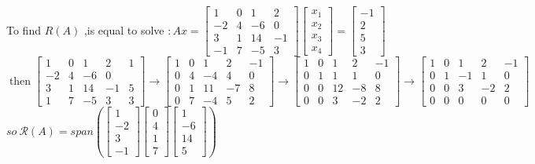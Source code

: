 \documentclass[english,onecolumn]{IEEEtran}
\begin{document}
\begin{enumerate}
To find $R(A)$ ,is equal to solve $: A x=\left[\begin{array}{cccc}1 & 0 & 1 & 2 \\ -2 & 4 & -6 & 0 \\ 3 & 1 & 14 & -1 \\ -1 & 7 & -5 & 3\end{array}\right]\left[\begin{array}{l}x_{1} \\ x_{2} \\ x_{3} \\ x_{4}\end{array}\right]=\left[\begin{array}{c}-1 \\ 2 \\ 5 \\ 3\end{array}\right]$
\\$\operatorname{then}\left[\begin{array}{cccc|c}1 & 0 & 1 & 2 & 1 \\ -2 & 4 & -6 & 0 \\ 3 & 1 & 14 & -1 & 5 \\ 1 & 7 & -5 & 3 & 3\end{array}\right] \rightarrow\left[\begin{array}{cccc|c}1 & 0 & 1 & 2 & -1 \\ 0 & 4 & -4 & 4 & 0 \\ 0 & 1 & 11 & -7 & 8 \\ 0 & 7 & -4 & 5 & 2\end{array}\right] \rightarrow\left[\begin{array}{cccc|c}1 & 0 & 1 & 2 & -1 \\ 0 & 1 & 1 & 1 & 0 \\ 0 & 0 & 12 & -8 & 8 \\ 0 & 0 & 3 & -2 & 2\end{array}\right] \rightarrow\left[\begin{array}{cccc|c}1 & 0 & 1 & 2 & -1 \\ 0 & 1 & -1 & 1 & 0 \\ 0 & 0 & 3 & -2 & 2 \\ 0 & 0 & 0 & 0 & 0\end{array}\right] $
\\$so\  \mathcal R(A)=span\left(\left[\begin{array}{c}1 \\ -2 \\ 3 \\ -1\end{array}\right]\left[\begin{array}{c}0 \\ 4 \\ 1 \\ 7\end{array}\right]\left[\begin{array}{c}1 \\ -6 \\ 14 \\ 5\end{array}\right]\right)$






\end{enumerate}
\end{document}
